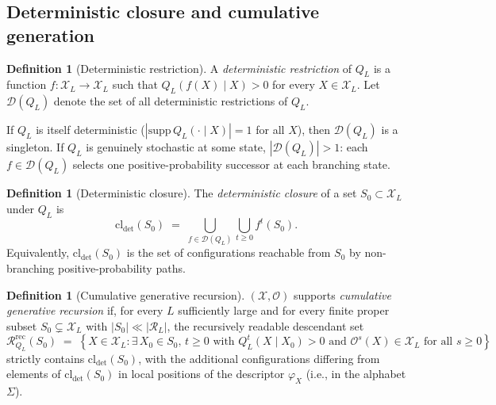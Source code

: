 \documentclass[11pt]{article}
\theoremstyle{plain}
\theoremstyle{definition}
\newtheorem{definition}[theorem]{Definition}
\newcommand{\descX}{\varphi_X}
\newcommand{\Xset}{\mathcal{X}}
\newcommand{\Op}{\mathcal{O}}
\newcommand{\Reach}{\mathcal{R}}
\begin{document}
\subsection{Deterministic closure and cumulative generation}
\label{subsec:gen_def}

\begin{definition}[Deterministic restriction]
\label{def:det_restriction}
A \emph{deterministic restriction} of $Q_L$ is a function $f : \Xset_L \to \Xset_L$ such that $Q_L(f(X) \mid X) > 0$ for every $X \in \Xset_L$. Let $\mathcal{D}(Q_L)$ denote the set of all deterministic restrictions of $Q_L$.
\end{definition}

If $Q_L$ is itself deterministic ($|\mathrm{supp}\, Q_L(\cdot \mid X)| = 1$ for all $X$), then $\mathcal{D}(Q_L)$ is a singleton. If $Q_L$ is genuinely stochastic at some state, $|\mathcal{D}(Q_L)| > 1$: each $f \in \mathcal{D}(Q_L)$ selects one positive-probability successor at each branching state.

\begin{definition}[Deterministic closure]
\label{def:det_closure}
The \emph{deterministic closure} of a set $S_0 \subset \Xset_L$ under $Q_L$ is
\begin{equation}
\mathrm{cl}_{\det}(S_0) \;=\; \bigcup_{f \in \mathcal{D}(Q_L)} \bigcup_{t \ge 0} f^t(S_0).
\end{equation}
Equivalently, $\mathrm{cl}_{\det}(S_0)$ is the set of configurations reachable from $S_0$ by non-branching positive-probability paths.
\end{definition}

\begin{definition}[Cumulative generative recursion]
\label{def:cumulative_generation}
$(\Xset, \Op)$ supports \emph{cumulative generative recursion} if, for every $L$ sufficiently large and for every finite proper subset $S_0 \subsetneq \Xset_L$ with $|S_0| \ll |\Reach_L|$, the recursively readable descendant set
\begin{equation}
\Reach_{Q_L}^{\mathrm{rec}}(S_0) \;=\; \left\{ X \in \Xset_L : \exists\, X_0 \in S_0,\, t \ge 0 \text{ with } Q_L^t(X \mid X_0) > 0 \text{ and } \Op^s(X) \in \Xset_L \text{ for all } s \ge 0 \right\}
\end{equation}
strictly contains $\mathrm{cl}_{\det}(S_0)$, with the additional configurations differing from elements of $\mathrm{cl}_{\det}(S_0)$ in local positions of the descriptor $\descX$ (i.e., in the alphabet $\Sigma$).
\end{definition}
\end{document}
